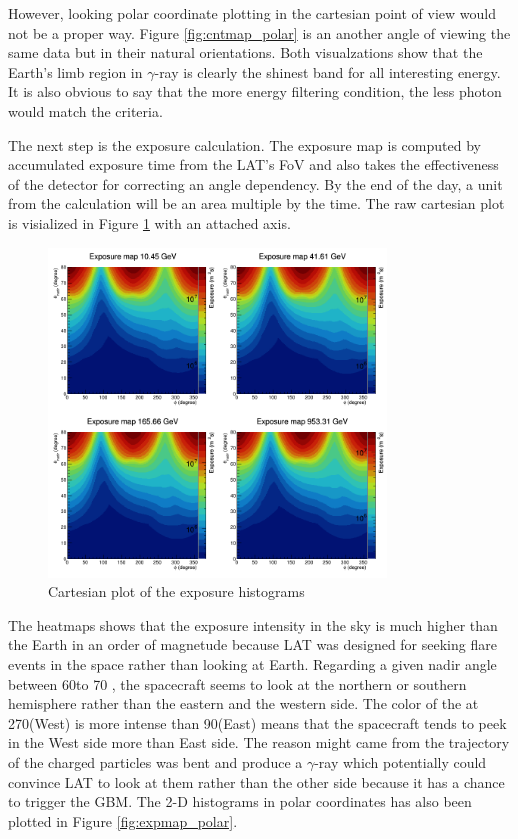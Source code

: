 However, looking polar coordinate plotting in the cartesian point of view 
would not be a proper way. Figure \ref{fig:cntmap_polar} is an another angle of viewing  
the same data but in their natural orientations.
Both visualzations show that the Earth's limb region in $\gamma$-ray 
is clearly the shinest band for all interesting energy.
It is also obvious to say that the more energy filtering condition,
the less photon would match the criteria.



The next step is the exposure calculation. The exposure map is computed 
by accumulated exposure time from the LAT's FoV and also takes the 
effectiveness of the detector for correcting an angle dependency.
By the end of the day, a unit from the calculation will be an 
area multiple by the time. The raw cartesian plot is visialized in
Figure \ref{fig:expmap_cartesian} with an attached axis.

\begin{figure}[h!]
    \centering
    \includegraphics[width=0.8\textwidth]{content/result_and_discussion/figures/cartesian_expmaps.png}
    \caption{Cartesian plot of the exposure histograms}
    \label{fig:expmap_cartesian}
\end{figure}


The heatmaps shows that the exposure intensity in the sky is much
higher than the Earth in an order of magnetude because LAT was designed
for seeking flare events in the space rather than looking at Earth.
Regarding a given nadir angle between 60\textdegree to 70 \textdegree,
the spacecraft seems to look at the northern or southern hemisphere 
rather than the eastern and the western side. The color of the 
at 270\textdegree (West) is more intense than 90\textdegree (East)
means that the spacecraft tends to peek in the West side more
than East side. The reason might came from the trajectory of the charged 
particles was bent and produce a $\gamma$-ray which potentially could 
convince LAT to look at them rather than the other side because it 
has a chance to trigger the GBM.
The 2-D histograms in polar coordinates has also been
plotted in Figure \ref{fig:expmap_polar}.


